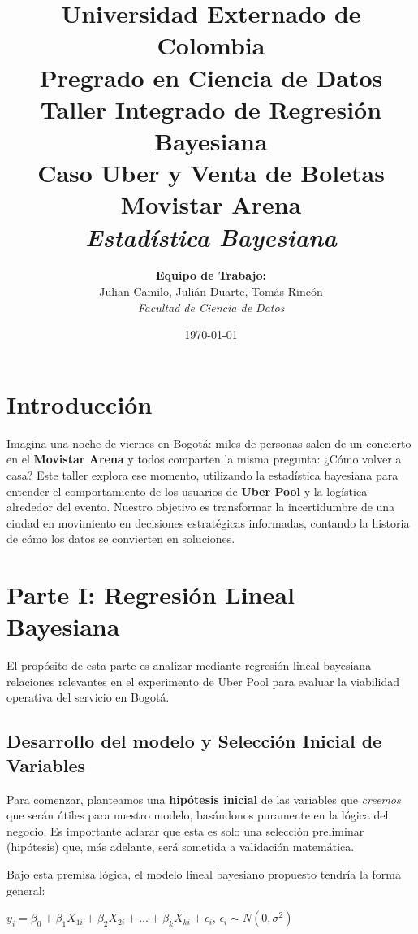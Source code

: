 \documentclass[11pt,a4paper]{article}
\title{
    \vspace{-2cm}
    \textbf{\Large Universidad Externado de Colombia} \\
    \large Pregrado en Ciencia de Datos \\
    \vspace{0.5cm}
    \textbf{\huge Taller Integrado de Regresión Bayesiana} \\
    \large Caso Uber y Venta de Boletas Movistar Arena \\
    \textit{Estadística Bayesiana}
}
\author{
    \textbf{Equipo de Trabajo:} \\
    Julian Camilo, Julián Duarte, Tomás Rincón \\
    \textit{Facultad de Ciencia de Datos}
}
\date{\today}
\begin{document}
\maketitle

\section*{Introducción}
Imagina una noche de viernes en Bogotá: miles de personas salen de un concierto en el \textbf{Movistar Arena} y todos comparten la misma pregunta: ¿Cómo volver a casa? Este taller explora ese momento, utilizando la estadística bayesiana para entender el comportamiento de los usuarios de \textbf{Uber Pool} y la logística alrededor del evento. Nuestro objetivo es transformar la incertidumbre de una ciudad en movimiento en decisiones estratégicas informadas, contando la historia de cómo los datos se convierten en soluciones.

\section{Parte I: Regresión Lineal Bayesiana}
El propósito de esta parte es analizar mediante regresión lineal bayesiana relaciones relevantes en el experimento de Uber Pool para evaluar la viabilidad operativa del servicio en Bogotá.

\subsection{Desarrollo del modelo y Selección Inicial de Variables}
Para comenzar, planteamos una \textbf{hipótesis inicial} de las variables que \textit{creemos} que serán útiles para nuestro modelo, basándonos puramente en la lógica del negocio. Es importante aclarar que esta es solo una selección preliminar (hipótesis) que, más adelante, será sometida a validación matemática.

Bajo esta premisa lógica, el modelo lineal bayesiano propuesto tendría la forma general:
\bigskip
\begin{center}
    $y_i = \beta_0 + \beta_1 X_{1i} + \beta_2 X_{2i} + \dots + \beta_k X_{ki} + \epsilon_i$,  $\epsilon_i \sim N(0, \sigma^2)$
\end{center}
\bigskip
\end{document}
